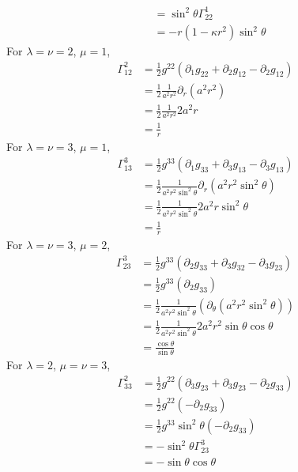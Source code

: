 \begin{enumerate}[label=(\alph*)]
\begin{align*}
						& = \sin^2{\theta} \Gamma^1_{22}\\
						& = -r(1-\kappa r^2)\sin^2{\theta}
		\end{align*}		
	For $\lambda=\nu=2$, $\mu=1$,
		\begin{align*}
		\Gamma^2_{12}  	& = \frac{1}{2} g^{22} ( \partial_1 g_{22} + \partial_2 g_{12} - \partial_2 g_{12}) 	\\
						& = \frac{1}{2} \frac{1}{a^2 r^2}  \partial_r (a^2 r^2 )\\
						& = \frac{1}{2} \frac{1}{a^2 r^2} 2a^2 r \\
						& =  \frac{1}{r}
		\end{align*}		
	For $\lambda=\nu=3$, $\mu=1$,
		\begin{align*}
		\Gamma^3_{13}  	& = \frac{1}{2} g^{33} ( \partial_1 g_{33} + \partial_3 g_{13} - \partial_3 g_{13}) 	\\
						& = \frac{1}{2} \frac{1}{a^2 r^2 \sin^2{\theta} }  \partial_r (a^2 r^2 \sin^2{\theta})\\
						& = \frac{1}{2} \frac{1}{a^2 r^2 \sin^2{\theta}} 2a^2 r \sin^2{\theta}\\
						& =  \frac{1}{r}
		\end{align*}		
	For $\lambda=\nu=3$, $\mu=2$,
		\begin{align*}
		\Gamma^3_{23}  	& = \frac{1}{2} g^{33} ( \partial_2 g_{33} + \partial_3 g_{32} - \partial_3 g_{23}) 	\\
						& = \frac{1}{2} g^{33} (\partial_2 g_{33}) \\
						& = \frac{1}{2} \frac{1}{a^2 r^2 \sin^2{\theta}} (\partial_\theta (a^2 r^2 \sin^2{\theta}))\\
						& = \frac{1}{2} \frac{1}{a^2 r^2 \sin^2{\theta}} 2a^2 r^2  \sin{\theta}  \cos{\theta}\\
						& = \frac{\cos{\theta}}{\sin{\theta}}
		\end{align*}		
	For $\lambda=2$, $\mu=\nu=3$,
		\begin{align*}
		\Gamma^2_{33}  	& = \frac{1}{2} g^{22} ( \partial_3 g_{23} + \partial_3 g_{23} - \partial_2 g_{33}) 	\\
						& = \frac{1}{2} g^{22} (- \partial_2 g_{33}) \\
						& = \frac{1}{2} g^{33} \sin^2{\theta} (- \partial_2 g_{33}) \\
						& = -\sin^2{\theta}\Gamma^3_{23} \\
						& = -\sin{\theta}\cos{\theta}
		\end{align*}		
\end{enumerate}

